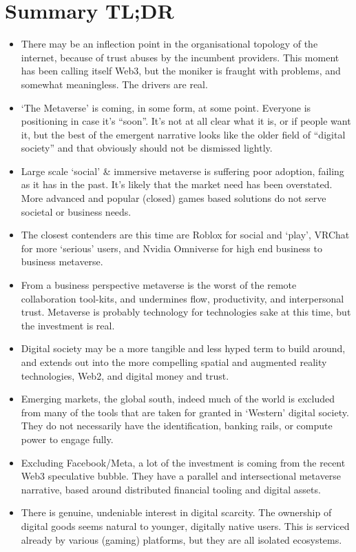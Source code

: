 \section{Summary TL;DR}
\label{sec:tldr}
\begin{itemize}
\item There may be an inflection point in the organisational topology of the internet, because of trust abuses by the incumbent providers. This moment has been calling itself Web3, but the moniker is fraught with problems, and somewhat meaningless. The drivers are real.
\item `The Metaverse' is coming, in some form, at some point. Everyone is positioning in case it's ``soon''. It's not at all clear what it is, or if people want it, but the best of the emergent narrative looks like the older field of ``digital society'' and that obviously should not be dismissed lightly.
\item Large scale `social' \& immersive metaverse is suffering poor adoption, failing as it has in the past. It's likely that the market need has been overstated. More advanced and popular (closed) games based solutions do not serve societal or business needs.
\item The closest contenders are this time are Roblox for social and `play', VRChat for more `serious' users, and Nvidia Omniverse for high end business to business metaverse.
\item From a business perspective metaverse is the worst of the remote collaboration tool-kits, and undermines flow, productivity, and interpersonal trust. Metaverse is probably technology for technologies sake at this time, but the investment is real. 
\item Digital society may be a more tangible and less hyped term to build around, and extends out into the more compelling spatial and augmented reality technologies, Web2, and digital money and trust.
\item Emerging markets, the global south, indeed much of the world is excluded from many of the tools that are taken for granted in `Western' digital society. They do not necessarily have the identification, banking rails, or compute power to engage fully.
\item Excluding Facebook/Meta, a lot of the investment is coming from the recent Web3 speculative bubble. They have a parallel and intersectional metaverse narrative, based around distributed financial tooling and digital assets. 
\item There is genuine, undeniable interest in digital scarcity. The ownership of digital goods seems natural to younger, digitally native users. This is serviced already by various (gaming) platforms, but they are all isolated ecosystems.

\end{itemize}
